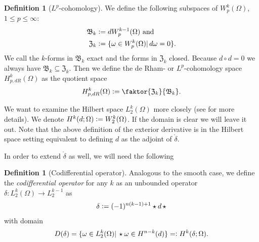 \documentclass[12pt,a4paper]{article}
\numberwithin{equation}{subsection}
\numberwithin{lemma}{subsection}
\theoremstyle{definition}
\newtheorem{definition}[lemma]{Definition}
\newcommand{\lpcoho}{H^k_{p,dR}}
\begin{document}
\begin{definition}[$L^p$-cohomology]
    We define the following subspaces of $W^k_p(\Omega)$, $1\leq p \leq\infty$:
    \begin{align*}
        \mathfrak{B}_k &\vcentcolon= dW^{k-1}_p(\Omega) \text{ and} \\
        \mathfrak{Z}_k &\vcentcolon= \{ \omega \in W^k_p(\Omega)| 
        \, d\omega = 0\}.
    \end{align*}
    We call the $k$-forms in $\mathfrak{B}_k$ exact and the forms in 
    $\mathfrak{Z}_k$ closed. Because $d \circ d=0$ we always have  
    $\mathfrak{B}_k \subseteq \mathfrak{Z}_k$.
    Then we define the de Rham- or $L^p$-cohomology space $\lpcoho(\Omega)$ as 
    the quotient space
    \begin{align*}
        \lpcoho (\Omega) \vcentcolon= \faktor{\mathfrak{Z}_k}{\mathfrak{B}_k}.
    \end{align*}
\end{definition}
\vspace{0.5cm}
We want to examine the Hilbert space $L^k_2(\Omega)$ more closely
(see \cite[Sec. 6.2.6]{arnold} for more details).  
We denote $H^k(d;\Omega) \vcentcolon= W^k_2(\Omega)$. If the domain is clear
we will leave it out. Note that the above definition of the exterior derivative
is in the Hilbert space setting equivalent to defining $d$ as the adjoint
of $\mathring{\delta}$. 



In order to extend $\mathring{\delta}$ as well, we will need the following

\begin{definition}[Codifferential operator]
    Analogous to the smooth case, 
    we define the \textit{codifferential operator} for any $k$ as an unbounded
    operator $\delta: L^k_2(\Omega) \rightarrow L^{k-1}_2$ as
    \begin{align*}
        \delta \vcentcolon= (-1)^{n(k-1)+1}\star d\,\star
    \end{align*}
    with domain
    \begin{align*}
        D(\delta) = \{ \omega \in L^k_2(\Omega) | \,
        \star\omega \in H^{n-k}(d) \} 
        =\vcentcolon H^k(\delta; \Omega).
    \end{align*}
\end{definition}
\end{document}
